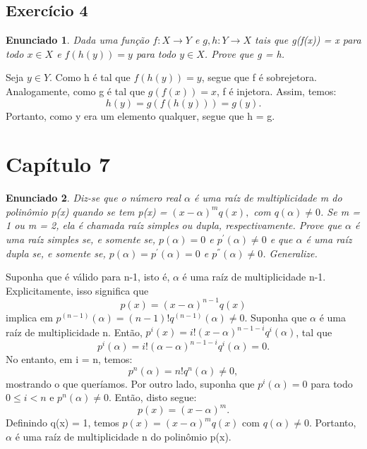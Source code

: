 \documentclass{article}
\newtheorem*{exercise*}{Enunciado}
\begin{document}
    \subsection{Exerc\'icio 4}
    \begin{exercise*}
        Dada uma fun\c c\~ao $f:X\rightarrow{Y}$ e $g, h:Y\rightarrow{X}$ tais que g(f(x)) = x 
        para todo $x\in{X}$ e $f(h(y)) = y$ para todo $y\in{X}$. Prove que g = h.
    \end{exercise*}

    Seja $y\in{Y}$. Como h \'e tal que $f(h(y)) = y$, segue que f \'e sobrejetora. Analogamente,
    como g \'e tal que $g(f(x)) = x$, f \'e injetora. Assim, temos: 
    $$
        h(y) = g(f(h(y))) = g(y).
    $$
    Portanto, como y era um elemento qualquer, segue que h = g.
    \qedsymbol

    \section{Cap\'itulo 7}
    \begin{exercise*}
        Diz-se que o n\'umero real $\alpha$ \'e uma ra\'iz de multiplicidade m do polin\^omio p(x) quando se    
        tem p(x) = $(x - \alpha)^mq(x),$ com $q(\alpha) \neq 0$. Se m = 1 ou m = 2, ela \'e chamada ra\'iz simples
        ou dupla, respectivamente. Prove que $\alpha$ \'e uma ra\'iz simples se, e somente se, $p(\alpha) = 0$ e $p^{'}(\alpha) \neq 0$
        e que $\alpha$ \'e uma ra\'iz dupla se, e somente se, $p(\alpha) = p^{'}(\alpha) = 0$ e $p^{''}(\alpha) \neq 0$. Generalize.
    \end{exercise*}
        Suponha que \'e v\'alido para n-1, isto \'e, $\alpha$ \'e uma ra\'iz de multiplicidade n-1. Explicitamente,
        isso significa que
        $$
            p(x) = (x - \alpha)^{n-1}q(x)
        $$
        implica em $p^{(n-1)}(\alpha) = (n-1)!q^{(n-1)}(\alpha)\neq 0$. Suponha que $\alpha$ \'e uma ra\'iz de 
        multiplicidade n. Ent\~ao, $p^{i}(x) = i!(x - \alpha)^{n-1-i}q^{i}(\alpha)$, tal que 
        $$
        p^{i}(\alpha) = i!(\alpha - \alpha)^{n-1-i}q^{i}(\alpha) = 0. 
        $$
        No entanto, em i = n, temos:
        $$
        p^{n}(\alpha) = n!q^{n}(\alpha) \neq 0,
        $$
        mostrando o que quer\'iamos. Por outro lado, suponha que $p^{i}(\alpha) = 0$ para todo $0\leq{i}<n$ e 
        $p^{n}(\alpha) \neq 0$. Ent\~ao, disto segue:
        $$
        p(x) = (x - \alpha)^m.
        $$ 
        Definindo q(x) = 1, temos $p(x) = (x - \alpha)^mq(x)$ com $q(\alpha) \neq 0$. Portanto, $\alpha$ \'e uma 
        ra\'iz de multiplicidade n do polin\^omio p(x).
\end{document}

